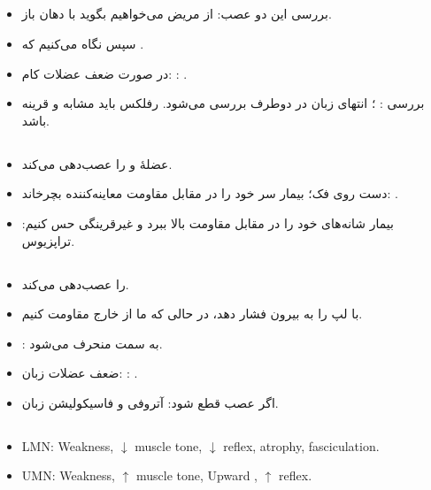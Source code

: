 \documentclass[a4paper,12pt]{extbook}
\begin{document}
\subsection*{}
\begin{itemize}
\item بررسی  این دو عصب: از مریض می‌خواهیم بگوید  با دهان باز.
\item سپس نگاه می‌کنیم که .
\item در صورت ضعف عضلات کام: : .
\item بررسی : ؛ انتهای زبان در دوطرف بررسی می‌شود. رفلکس باید مشابه و قرینه باشد.
\end{itemize}
\subsection*{}
\begin{itemize}
\item عضلهٔ  و  را عصب‌دهی می‌کند.
\item دست روی فک؛ بیمار سر خود را در مقابل مقاومت معاینه‌کننده بچرخاند: .
\item بیمار شانه‌های خود را در مقابل مقاومت بالا ببرد و غیرقرینگی حس کنیم: تراپزیوس.
\end{itemize}
\subsection*{}
\begin{itemize}
\item {} را عصب‌دهی می‌کند.
\item با  لپ را به بیرون فشار دهد، در حالی که ما از خارج مقاومت کنیم.
\item {}: به سمت  منحرف می‌شود.
\item ضعف عضلات زبان: : .
\item اگر عصب قطع شود: آتروفی و فاسیکولیشن زبان.
\end{itemize}

\subsection*{}
\begin{latin}
\begin{itemize}
\item LMN: Weakness, $\downarrow$ muscle tone, $\downarrow$ reflex, atrophy, fasciculation.
\item UMN: Weakness, $\uparrow$ muscle tone, Upward , $\uparrow$ reflex.
\end{itemize}
\end{latin}
\end{document}
